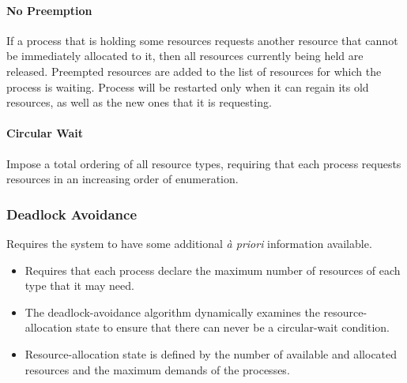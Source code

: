 \paragraph{No Preemption}
If a process that is holding some resources requests another resource that cannot be immediately allocated to it,
then all resources currently being held are released.
Preempted resources are added to the list of resources for which the process is waiting.
Process will be restarted only when it can regain its old resources, as well as the new ones that it is requesting.

\paragraph{Circular Wait}
Impose a total ordering of all resource types, requiring that each process requests resources in an increasing order of enumeration.

\subsubsection{Deadlock Avoidance}

Requires the system to have some additional \textit{à priori} information available.
\begin{itemize}
    \item Requires that each process declare the maximum number of resources of each type that it may need.
    \item The deadlock-avoidance algorithm dynamically examines the resource-allocation state to ensure that there can never be a circular-wait condition.
    \item Resource-allocation state is defined by the number of available and allocated resources and the maximum demands of the processes.
\end{itemize}